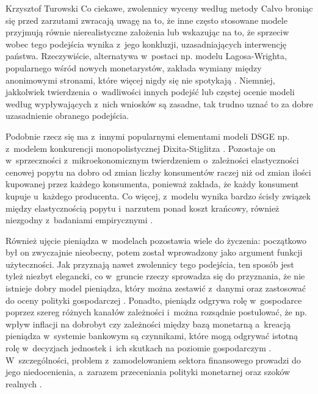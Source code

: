 \begin{artplenv}{Krzysztof Turowski}
Co ciekawe, zwolennicy wyceny według metody Calvo broniąc się przed zarzutami zwracają uwagę na to, że inne często
stosowane modele przyjmują równie nierealistyczne założenia lub wskazując na to, że sprzeciw wobec tego podejścia
wynika z~jego konkluzji, uzasadniających interwencję państwa. Rzeczywiście, alternatywa w~postaci np. modelu
Lagosa-Wrighta, popularnego wśród nowych monetarystów, zakłada wymiany między anonimowymi stronami, które więcej nigdy
się nie spotykają
\parencite{lagos_unified_2005}.
Niemniej, jakkolwiek twierdzenia o~wadliwości innych
podejść lub częstej ocenie modeli według wypływających z~nich wniosków są zasadne, tak trudno uznać to za dobre
uzasadnienie obranego podejścia.

Podobnie rzecz się ma z~innymi popularnymi elementami modeli DSGE np. z~modelem konkurencji monopolistycznej
Dixita-Stiglitza
\parencite{blanchard_monopolistic_1987}.
Pozostaje on w~sprzeczności z~mikroekonomicznym
twierdzeniem o~zależności elastyczności cenowej popytu na dobro od zmian liczby konsumentów raczej niż od zmian ilości
kupowanej przez każdego konsumenta, ponieważ zakłada, że każdy konsument kupuje u~każdego producenta. Co
więcej, z~modelu wynika bardzo ścisły związek między elastycznością popytu i~narzutem ponad koszt krańcowy, również
niezgodny z~badaniami empirycznymi
\parencite{yun_reconsidering_2011}.

Również ujęcie pieniądza w~modelach pozostawia wiele do życzenia: początkowo był on zwyczajnie nieobecny, potem został
wprowadzony jako argument funkcji użyteczności. Jak przyznają nawet zwolennicy tego podejścia, ten sposób jest tyleż
niezbyt elegancki, co w~gruncie rzeczy sprowadza się do przyznania, że nie istnieje dobry model pieniądza, który można
zestawić z~danymi oraz zastosować do oceny polityki gospodarczej
\parencite{fernandez-villaverde_econometrics_2010}.
Ponadto, pieniądz odgrywa rolę w~gospodarce poprzez szereg różnych kanałów zależności i~można rozsądnie postulować, że
np. wpływ inflacji na dobrobyt czy zależności między bazą monetarną a~kreacją pieniądza w~systemie bankowym są
czynnikami, które mogą odgrywać istotną rolę w~decyzjach jednostek i~ich skutkach na poziomie gospodarczym
\parencite{wallace_whither_2001}.
W~szczególności, problem z~zamodelowaniem sektora finansowego prowadzi do
jego niedocenienia, a~zarazem przeceniania polityki monetarnej oraz szoków realnych
\parencite{tovar_dsge_2009}.


\end{artplenv}
